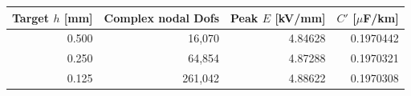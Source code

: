 \begin{center}\small
\begin{tabular}{@{}rrrr@{}}\toprule
Target $h$ [mm] & Complex nodal Dofs & Peak $E$ [kV/mm] & $C'$ [$\mu$F/km]\\\midrule
0.500 & 16,070 & 4.84628 & 0.1970442 \\
0.250 & 64,854 & 4.87288 & 0.1970321 \\
0.125 & 261,042 & 4.88622 & 0.1970308 \\
\bottomrule\end{tabular}\end{center}
